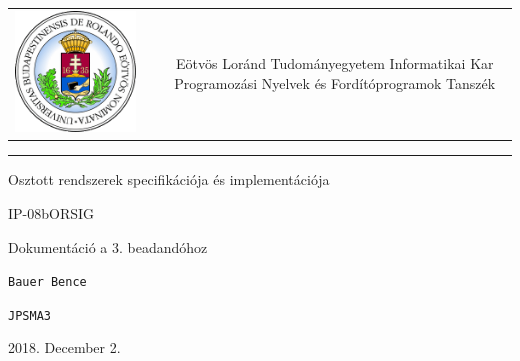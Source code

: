\documentclass[12pt]{article}
\begin{document}
\def\br{\\[0.2cm]}
\begin{titlepage}
	\vspace*{0cm}
	\centering
	\begin{tabular}{cp{1cm}c}
		\begin{minipage}{4cm}
			\vspace{0pt}
			\includegraphics[width=1\textwidth]{elte_cimer}
		\end{minipage} & &
		\begin{minipage}{7cm}
			\vspace{0pt}Eötvös Loránd Tudományegyetem \vspace{10pt} \newline
			Informatikai Kar \vspace{10pt} \newline
			Programozási Nyelvek és Fordítóprogramok Tanszék
		\end{minipage}
	\end{tabular}
	
	\vspace*{0.2cm}
	\rule{\textwidth}{1pt}
	
	\vspace*{3cm}
	{\Huge Osztott rendszerek specifikációja és implementációja }
	
	\vspace*{0.5cm}
	{\normalsize IP-08bORSIG}
	
	\vspace{2cm}
	{\huge Dokumentáció a 3. beadandóhoz}
	
	\vspace*{5cm}
	
	{\large \verb|Bauer Bence| }
	
	{\large \verb|JPSMA3| }
		
	
	\vfill
	
	\vspace*{1cm}
	2018. December 2.
\end{titlepage}
\end{document}
